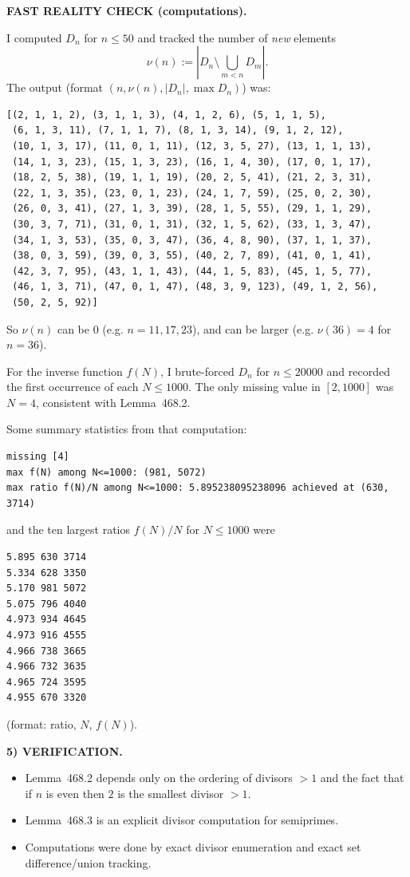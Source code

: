 \medskip
\noindent\textbf{FAST REALITY CHECK (computations).}

I computed $D_n$ for $n\le 50$ and tracked the number of \emph{new} elements
\[\nu(n):=|D_n\setminus \bigcup_{m<n} D_m|.\]
The output (format $(n,\nu(n),|D_n|,\max D_n)$) was:
\begin{verbatim}
[(2, 1, 1, 2), (3, 1, 1, 3), (4, 1, 2, 6), (5, 1, 1, 5),
 (6, 1, 3, 11), (7, 1, 1, 7), (8, 1, 3, 14), (9, 1, 2, 12),
 (10, 1, 3, 17), (11, 0, 1, 11), (12, 3, 5, 27), (13, 1, 1, 13),
 (14, 1, 3, 23), (15, 1, 3, 23), (16, 1, 4, 30), (17, 0, 1, 17),
 (18, 2, 5, 38), (19, 1, 1, 19), (20, 2, 5, 41), (21, 2, 3, 31),
 (22, 1, 3, 35), (23, 0, 1, 23), (24, 1, 7, 59), (25, 0, 2, 30),
 (26, 0, 3, 41), (27, 1, 3, 39), (28, 1, 5, 55), (29, 1, 1, 29),
 (30, 3, 7, 71), (31, 0, 1, 31), (32, 1, 5, 62), (33, 1, 3, 47),
 (34, 1, 3, 53), (35, 0, 3, 47), (36, 4, 8, 90), (37, 1, 1, 37),
 (38, 0, 3, 59), (39, 0, 3, 55), (40, 2, 7, 89), (41, 0, 1, 41),
 (42, 3, 7, 95), (43, 1, 1, 43), (44, 1, 5, 83), (45, 1, 5, 77),
 (46, 1, 3, 71), (47, 0, 1, 47), (48, 3, 9, 123), (49, 1, 2, 56),
 (50, 2, 5, 92)]
\end{verbatim}
So $\nu(n)$ can be $0$ (e.g. $n=11,17,23$), and can be larger (e.g. $\nu(36)=4$ for $n=36$).

For the inverse function $f(N)$, I brute-forced $D_n$ for $n\le 20000$ and recorded the first occurrence of each $N\le 1000$. The only missing value in $[2,1000]$ was $N=4$, consistent with Lemma~468.2.

Some summary statistics from that computation:
\begin{verbatim}
missing [4]
max f(N) among N<=1000: (981, 5072)
max ratio f(N)/N among N<=1000: 5.895238095238096 achieved at (630, 3714)
\end{verbatim}
and the ten largest ratios $f(N)/N$ for $N\le 1000$ were
\begin{verbatim}
5.895 630 3714
5.334 628 3350
5.170 981 5072
5.075 796 4040
4.973 934 4645
4.973 916 4555
4.966 738 3665
4.966 732 3635
4.965 724 3595
4.955 670 3320
\end{verbatim}
(format: ratio, $N$, $f(N)$).

\medskip
\noindent\textbf{5) VERIFICATION.}

\begin{itemize}
\item Lemma~468.2 depends only on the ordering of divisors $>1$ and the fact that if $n$ is even then $2$ is the smallest divisor $>1$.
\item Lemma~468.3 is an explicit divisor computation for semiprimes.
\item Computations were done by exact divisor enumeration and exact set difference/union tracking.
\end{itemize}

